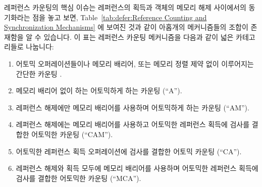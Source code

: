 레퍼런스 카운팅의 핵심 이슈는 레퍼런스의 획득과 객체의 메모리 해제 사이에서의
동기화라는 점을 놓고 보면,
Table~\ref{tab:defer:Reference Counting and Synchronization Mechanisms} 에
보여진 것과 같이 아홉개의 메커니즘들의 조합이 존재함을 알 수 있습니다.
이 표는 레퍼런스 카운팅 메커니즘을 다음과 같이 넓은 카테고리들로 나눕니다:
\iffalse

Given that the key reference-counting issue
is synchronization between acquisition
of a reference and freeing of the object, we have nine possible
combinations of mechanisms, as shown in
Table~\ref{tab:defer:Reference Counting and Synchronization Mechanisms}.
This table
divides reference-counting mechanisms into the following broad categories:
\fi
\begin{enumerate}
\item	어토믹 오퍼레이션들이나 메모리 배리어, 또는 메모리 정렬 제약 없이
	이루어지는 간단한 카운팅 .
\item	메모리 배리어 없이 하는 어토믹하게 하는 카운팅 (``A'').
\item	레퍼런스 해제에만 메모리 배리어를 사용하며 어토믹하게 하는 카운팅
	(``AM'').
\item	레퍼런스 해제에는 메모리 배리어를 사용하고 어토믹한 레퍼런스 획득에
	검사를 결합한 어토믹한 카운팅 (``CAM'').
\item	어토믹한 레퍼런스 획득 오퍼레이션에 검사를 결합한 어토믹 카운팅
	(``CA'').
\item	레퍼런스 해제와 획득 모두에 메모리 배리어를 사용하며 어토믹한 레퍼런스
	획득에 검사를 결합한 어토믹한 카운팅 (``MCA'').
\iffalse

\item	Simple counting with neither atomic operations, memory
	barriers, nor alignment constraints \makebox{(``-'')}.
\item	Atomic counting without memory barriers (``A'').
\item	Atomic counting, with memory barriers required only on release
	(``AM'').
\item	Atomic counting with a check combined with the atomic acquisition
	operation, and with memory barriers required only on release
	(``CAM'').
\item	Atomic counting with a check combined with the atomic acquisition
	operation (``CA'').
\item	Atomic counting with a check combined with the atomic acquisition
	operation, and with memory barriers also required on acquisition
	(``MCA'').
\fi
\end{enumerate}
